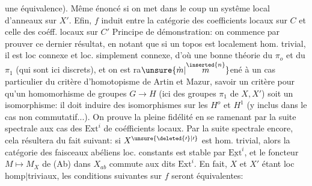 



 une équivalence). Même énoncé si on met dans le
coup un  systême local d'anneaux sur \(X'\).
Efin, \(f\) induit 
 entre la catégorie des coefficients locaux sur \(C\) et celle
des coéff. locaux sur \(C'\) 
 Principe de démonstration: on commence
par prouver ce dernier résultat, en notant que  si un topos est
localement hom. trivial, il est loc connexe et loc. simplement connexe,
d'où une bonne théorie du \(\pi_o\) et du \(\pi_1\) (qui sont ici discrets), et on est
ra\(\unsure{\grave{m}|\overset{\inserted{n}}{m}}\)ené  à un cas particulier du critère d'homotopisme de Artin et
Mazur, savoir un critère  pour qu'un homomorhisme de groupes \(G\longrightarrow H\) (ici des
groupes \(\pi_1\) de \(X,X'\)) soit un isomorphisme: il doit induire des isomorphismes
sur les \(H^o\) et \(H^1\) (y inclus dans le cas non commutatif...). On prouve
la pleine fidélité en se ramenant par la suite spectrale aux cas des \(\mathrm{Ext}^i\)
de coéfficients locaux. Par la suite spectrale encore, cela résultera du
fait suivant: si \(X^{\unsure{\deleted{\prime}|\prime}}\) est
 hom. trivial, alors la catégorie des
faisceaux abéliens loc. constants est stable par \(\underline{\mathrm{Ext}}^i\), et le foncteur
\(M\longmapsto M_X\) de (Ab) dans \(X_{ab}\) commute aux dits \(\mathrm{Ext}^i\).
En fait, \(X\) et \(X'\) étant loc homp\(\mid\)triviaux, les conditions suivantes sur \(f\)
seront équivalentes:

